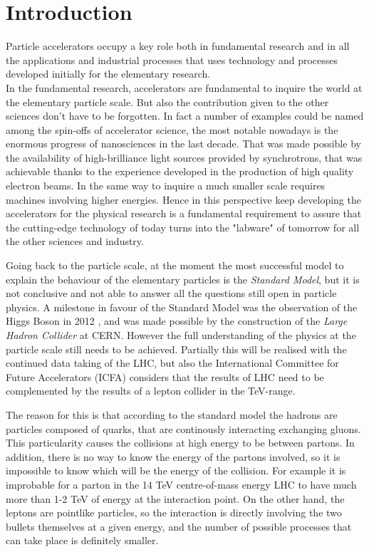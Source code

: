 \chapter{Introduction}
Particle accelerators occupy a key role both in fundamental research and in all the applications and industrial processes that uses technology and processes developed initially for the elementary research.\\
In the fundamental research, accelerators are fundamental to inquire the world at the elementary particle scale. But also the contribution given to the other sciences don't have to be forgotten.
In fact a number of examples could be named among the spin-offs of accelerator science, the most notable nowadays is the enormous progress of nanosciences in the last decade. That was made possible by the availability of high-brilliance light sources provided by synchrotrons, that was achievable thanks to the experience developed in the production of high quality electron beams. In the same way to inquire a much smaller scale requires machines involving higher energies.
 Hence in this perspective keep developing the accelerators for the physical research is a fundamental requirement to assure that the cutting-edge technology of today turns into the "labware" of tomorrow for all the other sciences and industry.

Going back to the particle scale, at the moment the most successful model to explain the behaviour of the elementary particles is the \textit{Standard Model}, but it is not conclusive and not able to answer all the questions still open in particle physics. A milestone in favour of the Standard Model was the observation of the Higgs Boson in 2012 \cite{CMS:higgs,ATLAS:higgs}, and was made possible by the construction of the \textit{Large Hadron Collider} at CERN\cite{LHC:design}. However the full understanding of the physics at the particle scale still needs to be achieved. Partially this will be realised with the continued data taking of the LHC, but also the International Committee for Future Accelerators (ICFA) considers that the results of LHC need to be complemented by the results of a lepton collider in the TeV-range\cite{ICFA:linStat}.

The reason for this is that according to the standard model the hadrons are particles composed of quarks, that are continously interacting exchanging gluons. This particularity causes the collisions at high energy to be between partons. In addition, there is no way to know the energy of the partons involved, so it is impossible to know which will be the energy of the collision. For example it is improbable for a parton in the 14 TeV centre-of-mass energy LHC to have much more than 1-2 TeV of energy at the interaction point\cite{LHC:partonDistrib}. On the other hand, the leptons are pointlike particles, so the interaction is directly involving the two bullets themselves at a given energy, and the number of possible processes that can take place is definitely smaller. 

